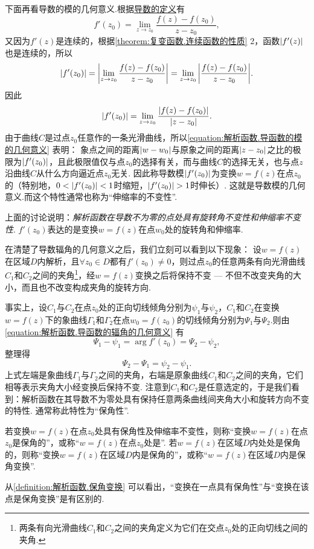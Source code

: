 下面再看导数的模的几何意义.根据\hyperref[equation:解析函数.导数的定义式]{导数的定义}有\[
f'(z_0) = \lim_{z \to z_0} \frac{f(z) - f(z_0)}{z - z_0},
\]又因为\(f'(z)\)是连续的，根据\cref{theorem:复变函数.连续函数的性质}  2，函数\(\abs{f'(z)}\)也是连续的，所以\[
\abs{f'(z_0)}
= \abs{ \lim_{z \to z_0} \frac{f(z) - f(z_0)}{z - z_0} }
= \lim_{z \to z_0} \abs{ \frac{f(z) - f(z_0)}{z - z_0} }.
\]因此\begin{equation}\label{equation:解析函数.导函数的模的几何意义}
\abs{f'(z_0)}
= \lim_{z \to z_0} \frac{\abs{f(z) - f(z_0)}}{\abs{z - z_0}}.
\end{equation}
由于曲线\(C\)是过点\(z_0\)任意作的一条光滑曲线，所以\cref{equation:解析函数.导函数的模的几何意义} 表明：
象点之间的距离\(\abs{w - w_0}\)与原象之间的距离\(\abs{z - z_0}\)之比的极限为\(\abs{f'(z_0)}\)，且此极限值仅与点\(z_0\)的选择有关，而与曲线\(C\)的选择无关，也与点\(z\)沿曲线\(C\)从什么方向逼近点\(z_0\)无关.
因此称导数模\(\abs{f'(z_0)}\)为变换\(w = f(z)\)在点\(z_0\)的（特别地，\(0 < \abs{f'(z_0)} < 1\)时缩短，\(\abs{f'(z_0)} > 1\)时伸长）.
这就是导数模的几何意义.而这个特性通常也称为“伸缩率的不变性”.

上面的讨论说明：\emph{解析函数在导数不为零的点处具有旋转角不变性和伸缩率不变性}.
\(f'(z_0)\)表达的是变换\(w = f(z)\)在点\(w_0\)处的旋转角和伸缩率.

在清楚了导数辐角的几何意义之后，我们立刻可以看到以下现象：
设\(w = f(z)\)在区域\(D\)内解析，且\(\forall z_0 \in D\)都有\(f'(z_0) \neq 0\)，则过点\(z_0\)的任意两条有向光滑曲线\(C_1\)和\(C_2\)之间的夹角\footnote{两条有向光滑曲线\(C_1\)和\(C_2\)之间的夹角定义为它们在交点\(z_0\)处的正向切线之间的夹角.}，经\(w = f(z)\)变换之后将保持不变 --- 不但不改变夹角的大小，而且也不改变构成夹角的旋转方向.

事实上，设\(C_1\)与\(C_2\)在点\(z_0\)处的正向切线倾角分别为\(\psi_1\)与\(\psi_2\)，\(C_1\)和\(C_2\)在变换\(w = f(z)\)下的象曲线\(\Gamma_1\)和\(\Gamma_2\)在点\(w_0 = f(z_0)\)的切线倾角分别为\(\Psi_1\)与\(\Psi_2\).则由\cref{equation:解析函数.导函数的辐角的几何意义} 有\[
\Psi_1 - \psi_1 = \arg f'(z_0) = \Psi_2 - \psi_2,
\]整理得\[
\Psi_2 - \Psi_1 = \psi_2 - \psi_1.
\]上式左端是象曲线\(\Gamma_1\)与\(\Gamma_2\)之间的夹角，右端是原象曲线\(C_1\)和\(C_2\)之间的夹角，它们相等表示夹角大小经变换后保持不变.
注意到\(C_1\)和\(C_2\)是任意选定的，于是我们看到：解析函数在其导数不为零处具有保持任意两条曲线间夹角大小和旋转方向不变的特性.
通常称此特性为“保角性”.

\begin{definition}\label{definition:解析函数.保角变换}
若变换\(w = f(z)\)在点\(z_0\)处具有保角性及伸缩率不变性，则称“变换\(w = f(z)\)在点\(z_0\)是保角的”，或称“\(w = f(z)\)在点\(z_0\)处是”.
若\(w = f(z)\)在区域\(D\)内处处是保角的，则称“变换\(w = f(z)\)在区域\(D\)内是保角的”，或称“\(w = f(z)\)在区域\(D\)内是保角变换”.
\end{definition}
从\cref{definition:解析函数.保角变换} 可以看出，“变换在一点具有保角性”与“变换在该点是保角变换”是有区别的.

